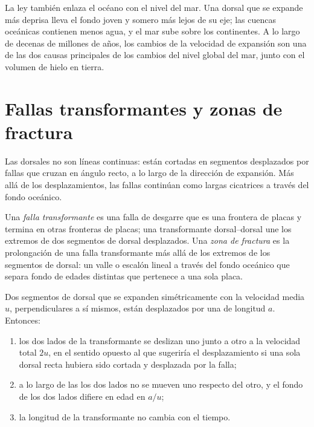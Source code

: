 La ley también enlaza el océano con el nivel del mar. Una dorsal que se expande más deprisa lleva el fondo joven y somero más lejos de su eje;
las cuencas oceánicas contienen menos agua, y el mar sube sobre los continentes. A lo largo de decenas de millones de años, los cambios de la
velocidad de expansión son una de las dos causas principales de los cambios del nivel global del mar, junto con el volumen de hielo en tierra.

\section{Fallas transformantes y zonas de fractura}

Las dorsales no son líneas continuas: están cortadas en segmentos desplazados por fallas que cruzan en ángulo recto, a lo largo de la dirección de
expansión. Más allá de los desplazamientos, las fallas continúan como largas cicatrices a través del fondo oceánico.

\begin{definition}\label{def:b1:rifts-ridges-margins:transform}
Una \emph{falla transformante} es una falla de desgarre que es una frontera de placas y termina en otras fronteras
de placas; una transformante dorsal--dorsal une los extremos de dos segmentos de dorsal desplazados. Una \emph{zona de fractura} es la prolongación de una falla transformante más allá de los extremos de los segmentos de dorsal: un valle o escalón lineal a través
del fondo oceánico que separa fondo de edades distintas que pertenece a una sola placa.
\end{definition}

\begin{proposition}\label{prop:b1:rifts-ridges-margins:transform}
Dos segmentos de dorsal que se expanden simétricamente con la velocidad media $u$, perpendiculares a sí mismos, están desplazados por una
 de longitud $a$. Entonces:
\begin{enumerate}
  \item los dos lados de la transformante se deslizan uno junto a otro a la velocidad total $2u$, en el sentido opuesto al que sugeriría el
        desplazamiento si una sola dorsal recta hubiera sido cortada y desplazada por la falla;
  \item a lo largo de las  los dos lados no se mueven uno respecto del otro, y el fondo de los dos lados difiere en edad en $a/u$;
  \item la longitud de la transformante no cambia con el tiempo.
\end{enumerate}
\end{proposition}

